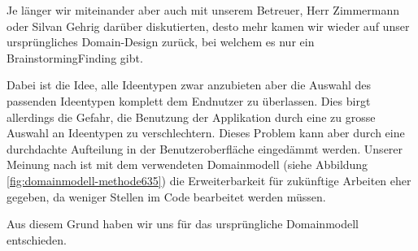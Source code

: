Je länger wir miteinander aber auch mit unserem Betreuer, Herr Zimmermann oder Silvan Gehrig darüber diskutierten, desto mehr kamen wir wieder auf unser ursprüngliches Domain-Design zurück, bei welchem es nur ein BrainstormingFinding gibt. 

Dabei ist die Idee, alle Ideentypen zwar anzubieten aber die Auswahl des passenden Ideentypen komplett dem Endnutzer zu überlassen. Dies birgt allerdings die Gefahr, die Benutzung der Applikation durch eine zu grosse Auswahl an Ideentypen zu verschlechtern. Dieses Problem kann aber durch eine durchdachte Aufteilung in der Benutzeroberfläche eingedämmt werden. Unserer Meinung nach ist mit dem verwendeten Domainmodell (siehe Abbildung \ref{fig:domainmodell-methode635}) die Erweiterbarkeit für zukünftige Arbeiten eher gegeben, da weniger Stellen im Code bearbeitet werden müssen. 

Aus diesem Grund haben wir uns für das ursprüngliche Domainmodell entschieden.